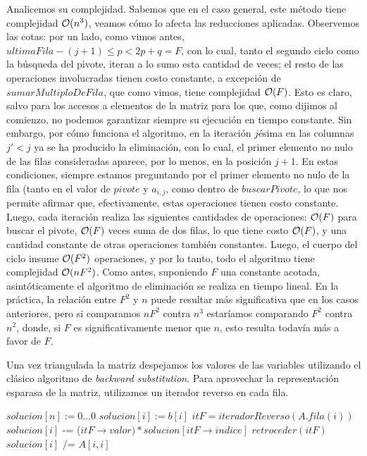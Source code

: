  Analicemos su complejidad. Sabemos que en el caso general, este método tiene complejidad $\mathcal{O}(n^3)$, veamos cómo lo afecta las reducciones aplicadas. Observemos las cotas: por un lado, como vimos antes, $ultimaFila - (j+1) \leq p < 2p+q = F$, con lo cual, tanto el segundo ciclo como la búsqueda del pivote, iteran a lo sumo esta cantidad de veces; el resto de las operaciones involucradas tienen costo constante, a excepción de $sumarMultiploDeFila$, que como vimos, tiene complejidad $\mathcal{O}(F)$. Esto es claro, salvo para los accesos a elementos de la matriz para los que, como dijimos al comienzo, no podemos garantizar siempre su ejecución en tiempo constante. Sin embargo, por cómo funciona el algoritmo, en la iteración $j$ésima en las columnas $j' <j$ ya se ha producido la eliminación, con lo cual, el primer elemento no nulo de las filas consideradas aparece, por lo menos, en la posición $j+1$. En estas condiciones, siempre estamos preguntando por el primer elemento no nulo de la fila (tanto en el valor de $pivote$ y $a_{i,j}$, como dentro de $buscarPivote$, lo que nos permite afirmar que, efectivamente, estas operaciones tienen costo constante. Luego, cada iteración realiza las siguientes cantidades de operaciones: $\mathcal{O}(F)$ para buscar el pivote, $\mathcal{O}(F)$ veces suma de dos filas, lo que tiene costo $\mathcal{O}(F)$, y una cantidad constante de otras operaciones también constantes. Luego, el cuerpo del ciclo insume $\mathcal{O}(F^2)$ operaciones, y por lo tanto, todo el algoritmo tiene complejidad $\mathcal{O}(nF^2)$. Como antes, suponiendo $F$ una constante acotada, asintóticamente el algoritmo de eliminación se realiza en tiempo lineal.  En la práctica, la relación entre $F^2$ y $n$ puede resultar más significativa que en los casos anteriores, pero si comparamos $nF^2$ contra $n^3$ estaríamos comparando $F^2$ contra $n^2$, donde, si $F$ es significativamente menor que $n$, esto resulta todavía más a favor de $F$.
 
 Una vez triangulada la matriz despejamos los valores de las variables utilizando el clásico algoritmo de \emph{backward substitution}. Para aprovechar la representación esparasa de la matriz, utilizamos un iterador reverso en cada fila.
 
 \begin{algorithm}[!h]
\caption{$despejar(A, b)$}
\begin{algorithmic}
\State $solucion[n] := 0 \dots 0$
	\State $solucion[i] := b[i]$
	\State $itF = iteradorReverso(A.fila(i))$
	        \State $solucion[i]$ -= ($itF \rightarrow valor) * solucion[itF \rightarrow indice]$
	        \State $retroceder(itF)$
      \EndWhile
      		\State $solucion[i]$ /= $A[i,i]$
\EndFor
\end{algorithmic}
\end{algorithm} 
 
